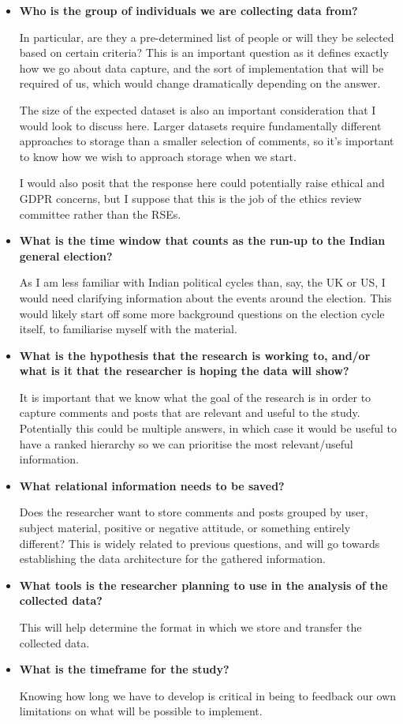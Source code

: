 \documentclass{article}
\begin{document}
\begin{itemize}
\item \textbf{Who is the group of individuals we are collecting data from?}

In particular, are they a pre-determined list of people or will they be selected based on certain criteria?
This is an important question as it defines exactly how we go about data capture, and the sort of implementation that will be required of us, which would change dramatically depending on the answer.

The size of the expected dataset is also an important consideration that I would look to discuss here.
Larger datasets require fundamentally different approaches to storage than a smaller selection of comments, so it's important to know how we wish to approach storage when we start.

I would also posit that the response here could potentially raise ethical and GDPR concerns, but I suppose that this is the job of the ethics review committee rather than the RSEs.

\item \textbf{What is the time window that counts as the run-up to the Indian general election?}

As I am less familiar with Indian political cycles than, say, the UK or US, I would need clarifying information about the events around the election.
This would likely start off some more background questions on the election cycle itself, to familiarise myself with the material.

\item \textbf{What is the hypothesis that the research is working to, and/or what is it that the researcher is hoping the data will show?}

It is important that we know what the goal of the research is in order to capture comments and posts that are relevant and useful to the study.
Potentially this could be multiple answers, in which case it would be useful to have a ranked hierarchy so we can prioritise the most relevant/useful information.

\item \textbf{What relational information needs to be saved?}

Does the researcher want to store comments and posts grouped by user, subject material, positive or negative attitude, or something entirely different?
This is widely related to previous questions, and will go towards establishing the data architecture for the gathered information.

\item \textbf{What tools is the researcher planning to use in the analysis of the collected data?}

This will help determine the format in which we store and transfer the collected data.

\item \textbf{What is the timeframe for the study?}

Knowing how long we have to develop is critical in being to feedback our own limitations on what will be possible to implement.
\end{itemize}
\end{document}
